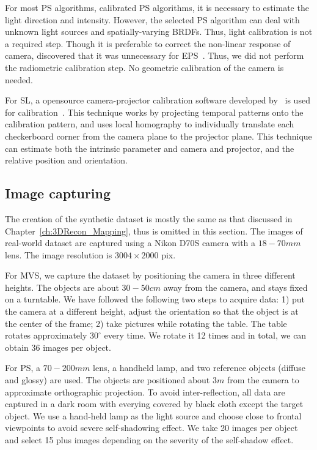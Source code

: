 For most PS algorithms, \ie calibrated PS algorithms, it is necessary to estimate the light direction and intensity. However, the selected PS algorithm can deal with unknown light sources and spatially-varying BRDFs. Thus, light calibration is not a required step. Though it is preferable to correct the non-linear response of camera, \citeauthor{hertzmann2005example} discovered that it was unnecessary for EPS~\cite{hertzmann2005example}. Thus, we did not perform the radiometric calibration step. No geometric calibration of the camera is needed.

For SL, a opensource camera-projector calibration software developed by~\citeauthor{moreno2012simple} is used for calibration~\cite{moreno2012simple}. This technique works by projecting temporal patterns onto the calibration pattern, and uses local homography to individually translate each checkerboard corner from the camera plane to the projector plane. This technique can estimate both the intrinsic parameter and camera and projector, and the relative position and orientation.

\subsection{Image capturing}
The creation of the synthetic dataset is mostly the same as that discussed in Chapter~\ref{ch:3DRecon_Mapping}, thus is omitted in this section. The images of real-world dataset are captured using a Nikon D70S camera with a $18-70mm$ lens. The image resolution is $3004\times 2000$ pix.

For MVS, we capture the dataset by positioning the camera in three different heights. The objects are about $30-50cm$ away from the camera, and stays fixed on a turntable. We have followed the following two steps to acquire data: 1) put the camera at a different height, adjust the orientation so that the object is at the center of the frame; 2) take pictures while rotating the table. The table rotates approximately $30^\circ$ every time. We rotate it 12 times and in total, we can obtain 36 images per object.

For PS, a $70-200mm$ lens, a handheld lamp, and two reference objects (diffuse and glossy) are used. The objects are positioned about $3m$ from the camera to approximate orthographic projection. To avoid inter-reflection, all data are captured in a dark room with everying covered by black cloth except the target object. We use a hand-held lamp as the light source and choose close to frontal viewpoints to avoid severe self-shadowing effect. We take 20 images per object and select 15 plus images depending on the severity of the self-shadow effect.

